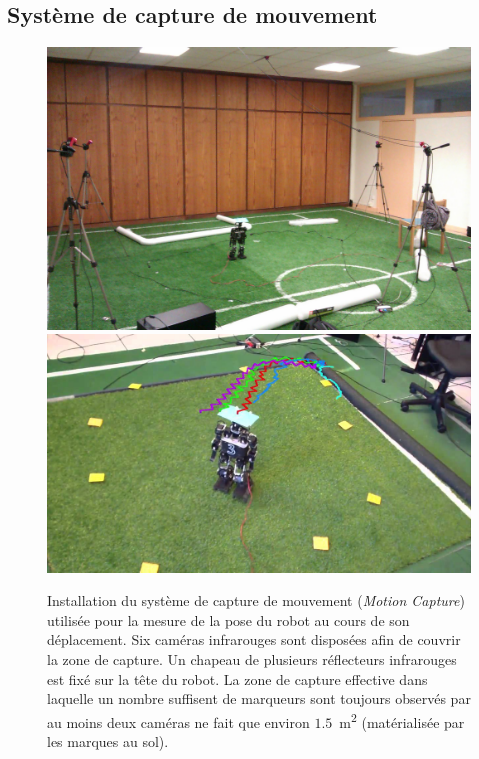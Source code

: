 \subsection{Système de capture de mouvement\label{sec:odometry_mocap}}

\begin{figure}[htbp]
    \begin{center}
        \includegraphics[width=0.8\linewidth]{../media/mocap_setup1.jpg}
        \includegraphics[width=0.8\linewidth]{../media/mocap_setup2.jpg}
        \caption{\label{fig:mocap_setup} Installation du système de capture de 
            mouvement (\textit{Motion Capture}) utilisée pour la mesure de la 
            pose du robot au cours de son déplacement. 
            Six caméras infrarouges sont disposées afin de couvrir la zone de capture.
            Un chapeau de plusieurs réflecteurs infrarouges est fixé sur la
            tête du robot.
            La zone de capture effective dans laquelle un nombre suffisent de marqueurs 
            sont toujours observés par au moins deux caméras ne fait que environ
            $1.5$~m\textsuperscript{2} (matérialisée par les marques au sol).
        }
    \end{center}
\end{figure}

